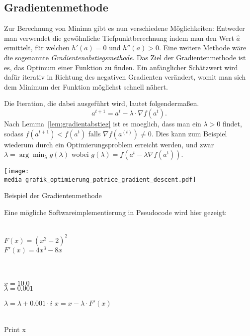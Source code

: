 \subsection{Gradientenmethode}

Zur Berechnung von Minima gibt es nun verschiedene Möglichkeiten:
Entweder man verwendet die gewöhnliche Tiefpunktberechnung indem man den Wert $\hat{a}$ 
ermittelt, f\"ur welchen $h'(a)=0$ und $h''(a)>0$. 
Eine weitere Methode w\"are die sogenannte \emph{Gradientenabstiegsmethode}. Das Ziel der Gradientenmethode ist es, das Optimum einer Funktion zu finden. Ein anfänglicher Schätzwert wird dafür iterativ in Richtung des negativen Gradienten 
ver\"andert, womit man sich dem Minimum der Funktion möglichst schnell n\"ahert.

Die Iteration, die dabei ausgef\"uhrt wird, lautet folgenderma\ss en. 
\begin{equation*}
a^{t+1}  =a^{t} - \lambda \cdot \nabla  f(a^{t}).
\end{equation*}
Nach Lemma~\ref{lem:gradientabstieg} ist es moeglich, dass man ein $\lambda > 0$ findet, sodass $f(a^{t+1}) < f(a^{t})$ falls $ \nabla f(a^{(t)}) \neq 0$. 
Dies kann zum Beispiel wiederum durch ein Optimierungsproblem erreicht werden, und zwar $\lambda=\arg\min_{\lambda} g(\lambda)$ wobei $g(\lambda)=f(a^t-\lambda\nabla f(a^t))$.




\begin{dsafigure}
\begin{center}
\texttt{[image: \\media grafik\_optimierung\_patrice\_gradient\_descent.pdf]}
\label{figure:grafik_optimierung_patrice_gradient_descent}
\caption{Beispiel der Gradientenmethode}
\end{center}
\end{dsafigure}

Eine mögliche Softwareimplementierung in Pseudocode wird hier gezeigt:

\begin{algorithmic}[1]

   \\$F(x) = (x^2-2)^2$
\\$F'(x) = 4x^3-8x$

\\
\\$x = 10.0$
\\$\lambda = 0.001$

 \State $\lambda = \lambda+0.001\cdot i$
    \State $x = x - \lambda \cdot F'(x)$
  \EndFor
\EndFor
 
 
\\Print x\EndProcedure
\Statex
\end{algorithmic}


